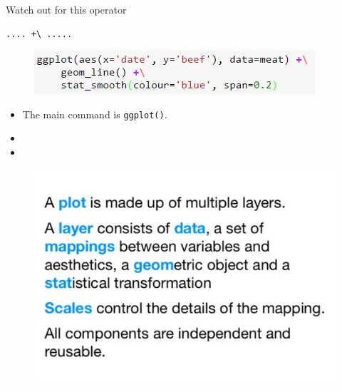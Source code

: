 \documentclass{beamer}
\begin{document}
\begin{frame}[fragile]
	\Large
Watch out for this operator
\begin{framed}
\begin{verbatim}
.... +\ .....
\end{verbatim}
\end{framed}
	\begin{figure}
\centering
\includegraphics[width=1.05\linewidth]{plusoperator}
\end{figure}
\end{frame}
\begin{frame}[fragile]
\Large
\begin{itemize}
\item The main command is \texttt{ggplot()}.
\item 
\item 
\end{itemize}
\end{frame}
\begin{frame}[fragile]
	\begin{figure}
\centering
\includegraphics[width=1.1\linewidth]{ggplot2-info}
\end{figure}

\end{frame}
\end{document}
